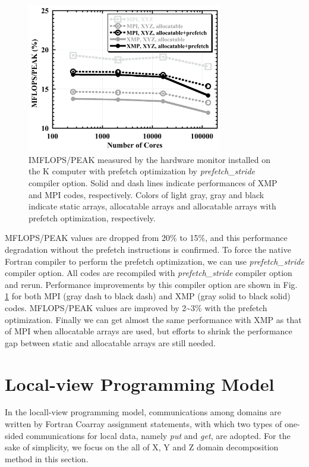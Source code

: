 \documentclass[graybox]{svmult}
\begin{document}
\begin{figure}[h]
\begin{center}
\includegraphics[width=8.5cm,bb= 0 0 459 352]{fig6-4.png}
\end{center}
\caption{IMFLOPS/PEAK measured by the hardware monitor installed on the K computer with prefetch optimization by {\it prefetch\_stride} compiler option. Solid and dash lines indicate performances of  XMP and MPI codes, respectively. Colors of light gray, gray and black indicate static arrays, allocatable arrays and allocatable arrays with prefetch optimization, respectively.}
\label{fig6-4} 
\end{figure}

MFLOPS/PEAK values are dropped from 20\% to 15\%, and this performance degradation without the prefetch instructions is confirmed. To force the native Fortran compiler to perform the prefetch optimization, we can use {\it prefetch\_stride} compiler option. All codes are recompiled with {\it prefetch\_stride} compiler option and rerun. Performance improvements by this compiler option are shown in Fig. \ref{fig6-4} for both MPI (gray dash to black dash) and XMP (gray solid to black solid) codes. MFLOPS/PEAK values are improved by 2\textasciitilde 3\% with the prefetch optimization. Finally we can get almost the same performance with XMP as that of MPI when allocatable arrays are used, but efforts to shrink the performance gap between static and allocatable arrays are still needed. 

\section{Local-view Programming Model}
In the locall-view programming model, communications among domains are written by Fortran Coarray assignment statements, with which two types of one-sided communications for local data, namely {\it put} and {\it get}, are adopted. For the sake of simplicity, we focus on the all of X, Y and Z domain decomposition method in this section.
\end{document}

